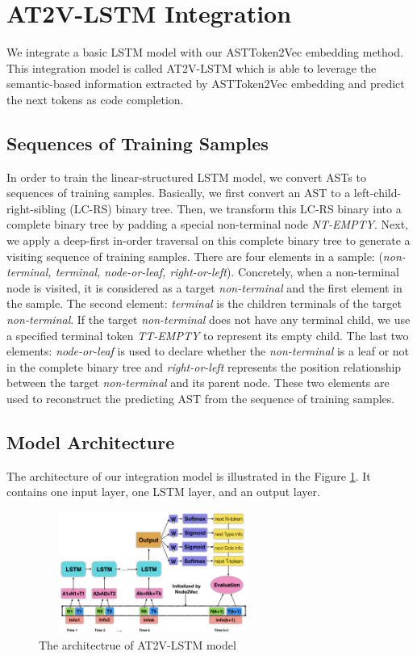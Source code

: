 \documentclass[T, E]{compsoft}
\begin{document}
\section{AT2V-LSTM Integration}
\label{section:n2v-lstm-integration}
We integrate a basic LSTM model with our ASTToken2Vec embedding method. This integration model is called AT2V-LSTM which is able to leverage the semantic-based information extracted by ASTToken2Vec embedding and predict the next tokens as code completion.


\subsection{Sequences of Training Samples}
In order to train the linear-structured LSTM model, we convert ASTs to sequences of training samples.
Basically, we first convert an AST to a left-child-right-sibling (LC-RS) binary tree. 
Then, we transform this LC-RS binary into a complete binary tree by padding a special non-terminal node \textit{NT-EMPTY}.
Next, we apply a deep-first in-order traversal on this complete binary tree to generate a visiting sequence of training samples. 
There are four elements in a sample: (\textit{non-terminal, terminal, node-or-leaf, right-or-left}).
Concretely, when a non-terminal node is visited, it is considered as a target \textit{non-terminal} and the first element in the sample.
The second element: \textit{terminal} is the children terminals of the target \textit{non-terminal}.
If the target \textit{non-terminal} does not have any terminal child, we use a specified terminal token \textit{TT-EMPTY} to represent its empty child.
The last two elements: \textit{node-or-leaf} is used to declare whether the \textit{non-terminal} is a leaf or not in the complete binary tree and \textit{right-or-left} represents the position relationship between the target \textit{non-terminal} and its parent node. 
These two elements are used to reconstruct the predicting AST from the sequence of training samples.



\subsection{Model Architecture}
The architecture of our integration model is illustrated in the Figure \ref{fig:nti2p_model_architecture}. 
It contains one input layer, one LSTM layer, and an output layer. 


\begin{figure}[!ht]
\centering
\includegraphics[height=4cm, width=7.5cm]{pictures/lstm_structure.png}
\caption{The architectrue of AT2V-LSTM model}
\label{fig:nti2p_model_architecture}
\end{figure}
\end{document}

